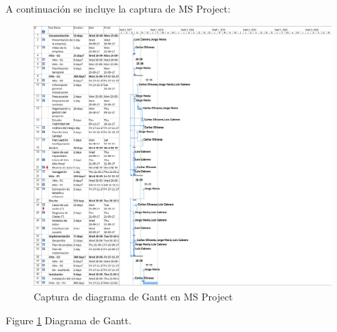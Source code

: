 \par A continuación se incluye la captura de MS Project:
\begin{figure}
  \centering
    \includegraphics[width=1\textwidth]{img/gantt.png}
  \caption{Captura de diagrama de Gantt en MS Project}
  \label{fig:gantt}
\end{figure}
Figure \ref{fig:gantt} Diagrama de Gantt.
